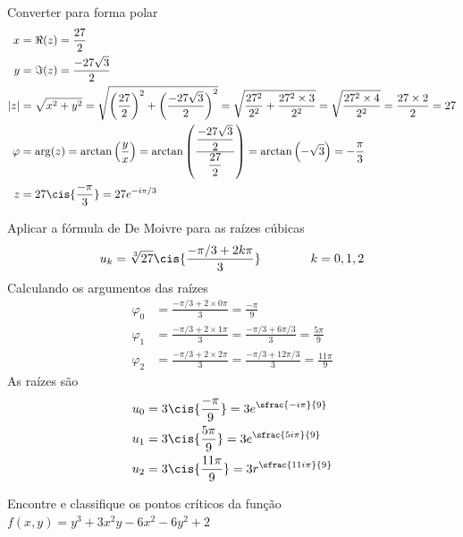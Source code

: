\documentclass[a4paper,12pt,fleqn]{article}
\begin{document}
\begin{answer}
    Converter para forma polar
    \begin{align*}
        x       & = \Re(z) = \frac{27}{2}         \\
        y       & = \Im(z) = \frac{-27\sqrt{3}}{2} \\
        |z|     & = \sqrt{x^2+y^2}
                  = \sqrt{\left(\frac{27}{2}\right)^2 + \left(\frac{-27\sqrt{3}}{2}\right)^2}
                  = \sqrt{\frac{27^2}{2^2} + \frac{27^2\times 3}{2^2}}
                  = \sqrt{\frac{27^2\times 4}{2^2}}
                  = \frac{27\times 2}{2}
                  = 27         \\
        \varphi & = \arg(z)
                  = \arctan\left(\frac{y}{x}\right)
                  = \arctan\left(\frac{\dfrac{-27\sqrt{3}}{2}}{\dfrac{27}{2}}\right)
                  = \arctan\left(-\sqrt{3}\right)
                  = - \frac{\pi}{3} \\
        z       & = 27 \cis{\frac{-\pi}{3}}
        = 27 e^{-i\pi/3}
      \end{align*}

    Aplicar a fórmula de De Moivre para as raízes cúbicas
    \[
      u_k
      = \sqrt[3]{27}\cis{\frac{-\pi/3 + 2k\pi}{3}}
      \qquad\qquad k = 0,1,2
    \]
    Calculando os argumentos das raízes
    \begin{align*}
        \varphi_0
        & = \frac{-\pi/3 + 2\times 0\pi}{3}
          = \frac{-\pi}{9} \\
        \varphi_1
        & = \frac{-\pi/3 + 2\times 1\pi}{3}
          = \frac{-\pi/3 + 6\pi/3}{3}
          = \frac{5\pi}{9} \\
        \varphi_2
        & = \frac{-\pi/3 + 2\times 2\pi}{3}
          = \frac{-\pi/3 + 12\pi/3}{3}
          = \frac{11\pi}{9}
      \end{align*}
    As raízes são
    \begin{align*}
        u_0 & = 3\cis{\frac{ -\pi}{9}} = 3e^{\sfrac{- i\pi}{9}} \\
        u_1 & = 3\cis{\frac{ 5\pi}{9}} = 3e^{\sfrac{5 i\pi}{9}} \\
        u_2 & = 3\cis{\frac{11\pi}{9}} = 3r^{\sfrac{11i\pi}{9}}
      \end{align*}
\end{answer}

Encontre e classifique os pontos críticos da função
\(
  f(x, y) = y^3 + 3x^2y - 6x^2 - 6y^2 + 2
\)
\clearpagequestiononly
\end{document}
